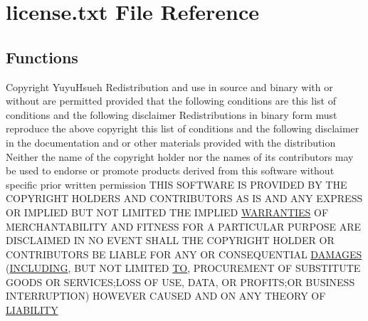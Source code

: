 \hypertarget{license_8txt}{}\section{license.\+txt File Reference}
\label{license_8txt}
\subsection*{Functions}
\begin{DoxyCompactItemize}
\item 
Copyright Yuyu\+Hsueh Redistribution and use in source and binary with or without are permitted provided that the following conditions are this list of conditions and the following disclaimer Redistributions in binary form must reproduce the above copyright this list of conditions and the following disclaimer in the documentation and or other materials provided with the distribution Neither the name of the copyright holder nor the names of its contributors may be used to endorse or promote products derived from this software without specific prior written permission T\+H\+IS S\+O\+F\+T\+W\+A\+RE IS P\+R\+O\+V\+I\+D\+ED BY T\+HE C\+O\+P\+Y\+R\+I\+G\+HT H\+O\+L\+D\+E\+RS A\+ND C\+O\+N\+T\+R\+I\+B\+U\+T\+O\+RS AS IS A\+ND A\+NY E\+X\+P\+R\+E\+SS OR I\+M\+P\+L\+I\+ED B\+UT N\+OT L\+I\+M\+I\+T\+ED T\+HE I\+M\+P\+L\+I\+ED \hyperlink{license_8txt_a042eb66328050ad88743187ae8e43b95}{W\+A\+R\+R\+A\+N\+T\+I\+ES} OF M\+E\+R\+C\+H\+A\+N\+T\+A\+B\+I\+L\+I\+TY A\+ND F\+I\+T\+N\+E\+SS F\+OR A P\+A\+R\+T\+I\+C\+U\+L\+AR P\+U\+R\+P\+O\+SE A\+RE D\+I\+S\+C\+L\+A\+I\+M\+ED IN NO E\+V\+E\+NT S\+H\+A\+LL T\+HE C\+O\+P\+Y\+R\+I\+G\+HT H\+O\+L\+D\+ER OR C\+O\+N\+T\+R\+I\+B\+U\+T\+O\+RS BE L\+I\+A\+B\+LE F\+OR A\+NY OR C\+O\+N\+S\+E\+Q\+U\+E\+N\+T\+I\+AL \hyperlink{license_8txt_aef6a70d7e2ff0800bdd6b6c943108868}{D\+A\+M\+A\+G\+ES} (\hyperlink{license_8txt_ac6699313e23a90e93d8db75154e2e689}{I\+N\+C\+L\+U\+D\+I\+NG}, B\+UT N\+OT L\+I\+M\+I\+T\+ED \hyperlink{license_8txt_a4bddb9a7dc45727be85d1869ee6c870d}{TO}, P\+R\+O\+C\+U\+R\+E\+M\+E\+NT OF S\+U\+B\+S\+T\+I\+T\+U\+TE G\+O\+O\+DS OR S\+E\+R\+V\+I\+C\+ES;L\+O\+SS OF U\+SE, D\+A\+TA, OR P\+R\+O\+F\+I\+TS;OR B\+U\+S\+I\+N\+E\+SS I\+N\+T\+E\+R\+R\+U\+P\+T\+I\+ON) H\+O\+W\+E\+V\+ER C\+A\+U\+S\+ED A\+ND ON A\+NY T\+H\+E\+O\+RY OF \hyperlink{license_8txt_a293cddb201641aed1186322968630e55}{L\+I\+A\+B\+I\+L\+I\+TY}
\item 

\end{DoxyCompactItemize}
